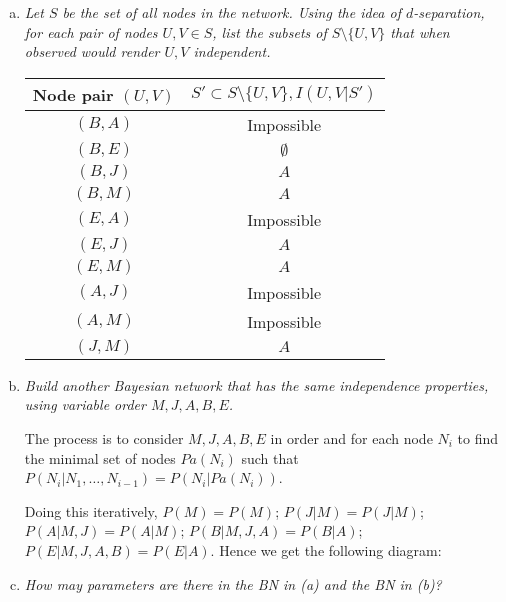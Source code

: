 \documentclass{article}
\begin{document}
\begin{enumerate}[(a)]
\item \textit{Let $S$ be the set of all nodes in the network. Using the idea 
  of $d$-separation, for each pair of nodes $U,V\in S$, list the subsets of
  $S\setminus \{U,V\}$ that when observed would render $U,V$ independent.}

  \begin{tabular}{|c|c|}
  \hline
  Node pair $(U,V)$ & $S'\subset S\setminus \{U,V\},I(U,V|S')$ \\
  \hline
  $(B, A)$ & Impossible \\
  $(B, E)$ & $\emptyset$ \\
  $(B, J)$ & $A$ \\ 
  $(B, M)$ & $A$ \\
  $(E, A)$ & Impossible \\
  $(E, J)$ & $A$ \\
  $(E, M)$ & $A$ \\
  $(A, J)$ & Impossible \\
  $(A, M)$ & Impossible \\
  $(J, M)$ & $A$ \\
  \hline
  \end{tabular}

\item \textit{Build another Bayesian network that has the same independence 
  properties, using variable order $M,J,A,B,E$.}

  The process is to consider $M,J,A,B,E$ in order and for each node $N_i$ to find 
  the minimal set of nodes $Pa(N_i)$ such that $P(N_i|N_1,\ldots,N_{i-1})=P(N_i|Pa(N_i))$. 

  Doing this iteratively, $P(M)=P(M)$; $P(J|M)=P(J|M)$; $P(A|M,J)=P(A|M)$; 
  $P(B|M,J,A)=P(B|A)$; $P(E|M,J,A,B)=P(E|A)$. Hence we get the following diagram:

\begin{center}
\end{center}
\item \textit{How may parameters are there in the BN in (a) and the BN in (b)?}


\end{enumerate}
\end{document}
